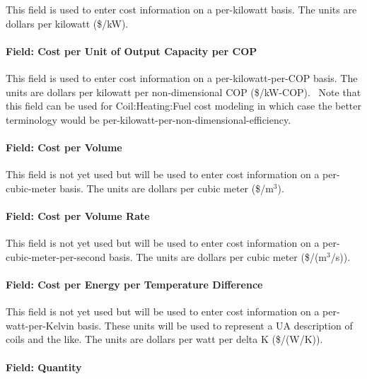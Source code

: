 This field is used to enter cost information on a per-kilowatt basis. The units are dollars per kilowatt (\$/kW).

\paragraph{Field: Cost per Unit of Output Capacity per COP}\label{field-cost-per-unit-of-output-capacity-per-cop}

This field is used to enter cost information on a per-kilowatt-per-COP basis. The units are dollars per kilowatt per non-dimensional COP (\$/kW-COP).~ Note that this field can be used for Coil:Heating:Fuel cost modeling in which case the better terminology would be per-kilowatt-per-non-dimensional-efficiency.

\paragraph{Field: Cost per Volume}\label{field-cost-per-volume}

This field is not yet used but will be used to enter cost information on a per-cubic-meter basis. The units are dollars per cubic meter (\$/m\(^{3}\)).

\paragraph{Field: Cost per Volume Rate}\label{field-cost-per-volume-rate}

This field is not yet used but will be used to enter cost information on a per-cubic-meter-per-second basis. The units are dollars per cubic meter (\$/(m\(^{3}\)/s)).

\paragraph{Field: Cost per Energy per Temperature Difference}\label{field-cost-per-energy-per-temperature-difference}

This field is not yet used but will be used to enter cost information on a per-watt-per-Kelvin basis. These units will be used to represent a UA description of coils and the like. The units are dollars per watt per delta K (\$/(W/K)).

\paragraph{Field: Quantity}\label{field-quantity}


